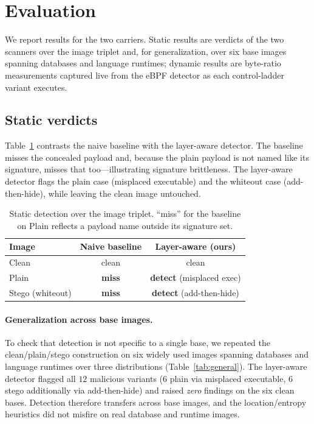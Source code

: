 \documentclass[sigconf,nonacm]{acmart}
\begin{document}
\section{Evaluation}
\label{sec:eval}
We report results for the two carriers. Static results are verdicts of the two
scanners over the image triplet and, for generalization, over six base images
spanning databases and language runtimes; dynamic results are byte-ratio
measurements captured live from the eBPF detector as each control-ladder variant
executes.

\subsection{Static verdicts}
Table~\ref{tab:static} contrasts the naive baseline with the layer-aware
detector. The baseline misses the concealed payload and, because the plain
payload is not named like its signature, misses that too---illustrating signature
brittleness. The layer-aware detector flags the plain case (misplaced executable)
and the whiteout case (add-then-hide), while leaving the clean image untouched.

\begin{table}[t]
\caption{Static detection over the image triplet. ``miss'' for the baseline on
Plain reflects a payload name outside its signature set.}
\label{tab:static}
\small
\begin{tabular}{@{}lcc@{}}
\toprule
Image & Naive baseline & Layer-aware (ours) \\
\midrule
Clean & clean & clean \\
Plain & \textbf{miss} & \textbf{detect} (misplaced exec) \\
Stego (whiteout) & \textbf{miss} & \textbf{detect} (add-then-hide) \\
\bottomrule
\end{tabular}
\end{table}

\paragraph{Generalization across base images.}
To check that detection is not specific to a single base, we repeated the
clean/plain/stego construction on six widely used images spanning databases and
language runtimes over three distributions (Table~\ref{tab:general}). The
layer-aware detector flagged all $12$ malicious variants ($6$ plain via misplaced
executable, $6$ stego additionally via add-then-hide) and raised \emph{zero}
findings on the six clean bases. Detection therefore transfers across base
images, and the location/entropy heuristics did not misfire on real database and
runtime images.
\end{document}
